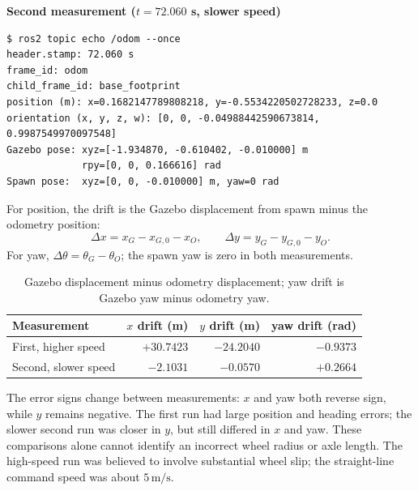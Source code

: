 \documentclass[10pt,a4paper]{article}
\begin{document}
\noindent\textbf{Second measurement ($t=72.060$ s, slower speed)}
\begin{lstlisting}
$ ros2 topic echo /odom --once
header.stamp: 72.060 s
frame_id: odom
child_frame_id: base_footprint
position (m): x=0.1682147789808218, y=-0.5534220502728233, z=0.0
orientation (x, y, z, w): [0, 0, -0.04988442590673814, 0.9987549970097548]
Gazebo pose: xyz=[-1.934870, -0.610402, -0.010000] m
             rpy=[0, 0, 0.166616] rad
Spawn pose:  xyz=[0, 0, -0.010000] m, yaw=0 rad
\end{lstlisting}

For position, the drift is the Gazebo displacement from spawn minus the
odometry position:
\[
\Delta x=x_{G}-x_{G,0}-x_O,\qquad
\Delta y=y_{G}-y_{G,0}-y_O.
\]
For yaw, $\Delta\theta=\theta_G-\theta_O$; the spawn yaw is zero in both
measurements.

\begin{table}[H]
\centering
\small
\renewcommand{\arraystretch}{1.15}
\begin{tabular}{@{}lrrr@{}}
\toprule
Measurement & $x$ drift (m) & $y$ drift (m) & yaw drift (rad) \\
\midrule
First, higher speed & $+30.7423$ & $-24.2040$ & $-0.9373$ \\
Second, slower speed & $-2.1031$ & $-0.0570$ & $+0.2664$ \\
\bottomrule
\end{tabular}
\caption{Gazebo displacement minus odometry displacement; yaw drift is Gazebo yaw minus odometry yaw.}
\label{tab:odom-drift}
\end{table}

The error signs change between measurements: $x$ and yaw both reverse sign,
while $y$ remains negative. The first run had large position and heading
errors; the slower second run was closer in $y$, but still differed in $x$
and yaw. These comparisons alone cannot identify an incorrect wheel radius or
axle length. The high-speed run was believed to involve substantial wheel
slip; the straight-line command speed was about $5\,\mathrm{m/s}$.


\end{document}
